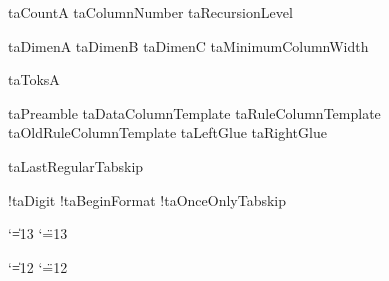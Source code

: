 \newskip\LeftTabskip
\newskip\RightTabskip



\newcount\!taCountA
\newcount\!taColumnNumber
\newcount\!taRecursionLevel %

\newdimen\!taDimenA  %
\newdimen\!taDimenB  %
\newdimen\!taDimenC  %
\newdimen\!taMinimumColumnWidth

\newtoks\!taToksA

\newtoks\!taPreamble
\newtoks\!taDataColumnTemplate
\newtoks\!taRuleColumnTemplate
\newtoks\!taOldRuleColumnTemplate
\newtoks\!taLeftGlue
\newtoks\!taRightGlue

\newskip\!taLastRegularTabskip

\newif\if!taDigit
\newif\if!taBeginFormat
\newif\if!taOnceOnlyTabskip




\def\TaBlE{%
  T\kern-.27em\lower.5ex\hbox{A}\kern-.18em B\kern-.1em
    \lower.5ex\hbox{L}\kern-.075em E}




{\catcode`\|=13 \catcode`\"=13
  \gdef\ActivateBarAndQuote{%
    \ifnum \catcode`\|=13
    \else
      \catcode`\|=13
      \def|{%
        \ifmmode
          \vert
        \else
          \char`\|
        \fi}%
    \fi
    \ifnum \catcode`\"=13
    \else
      \catcode`\"=13
      \def"{\char`\"}%
    \fi}}

{\catcode `\|=12 \catcode `\"=12
\gdef\VBar{|}
\gdef\DQuote{"}}


